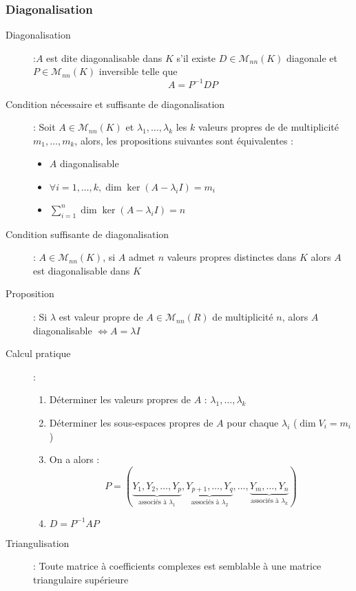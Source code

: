 \subsubsection{Diagonalisation}
\begin{description}
\item[Diagonalisation] :$A$ est dite diagonalisable dans $K$ s'il existe $D\in\mathcal M_{nn}(K)$ diagonale et $P\in\mathcal M_{nn}(K)$ inversible telle que
    \[ A=P^{-1}DP \]
\item[Condition nécessaire et suffisante de diagonalisation] : Soit $A\in\mathcal M_{nn}(K)$ et $\lambda_1,\dots,\lambda_k$ les $k$ valeurs propres de de multiplicité $m_1,\dots,m_k$, alors,
    les propositions suivantes sont équivalentes : 
    \begin{itemize}
        \item $A$ diagonalisable
        \item $\forall i=1,\dots,k,\dim\ker(A-\lambda_iI)=m_i$
        \item $\sum_{i=1}^n\dim\ker(A-\lambda_iI)=n$
    \end{itemize}
\item[Condition suffisante de diagonalisation] : $A\in\mathcal M_{nn}(K)$, si $A$ admet $n$ valeurs propres distinctes dans $K$ alors $A$ est diagonalisable dans $K$
\item[Proposition] : Si $\lambda$ est valeur propre de $A\in\mathcal M_{nn}(R)$ de multiplicité $n$, alors $A$ diagonalisable $\Leftrightarrow A=\lambda I$
\item[Calcul pratique] : 
    \begin{enumerate}
        \item Déterminer les valeurs propres de $A$ : $\lambda_1,\dots,\lambda_k$
        \item Déterminer les sous-espaces propres de $A$ pour chaque $\lambda_i$ ($\dim V_i=m_i$)
        \item On a alors : 
            \[
                P=\left(
                \underbrace{Y_1,Y_2,\dots,Y_p}_{\textrm{associés à }\lambda_1},
                \underbrace{Y_{p+1},\dots,Y_q}_{\textrm{associés à }\lambda_2},
                \dots,
                \underbrace{Y_m,\dots,Y_n}_{\textrm{associés à }\lambda_k}
                \right)
            \]
        \item $D=P^{-1}AP$
    \end{enumerate}
\item[Triangulisation] : Toute matrice à coefficients complexes est semblable à une matrice triangulaire supérieure

\end{description}
